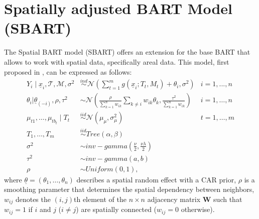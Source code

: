 \documentclass[11pt,a4paper]{article}
\newcommand{\mat}[1]{\mathbf{#1}}
\newcommand{\vect}[1]{\underline{#1}}
\begin{document}
\newpage
\section{Spatially adjusted BART Model (SBART)}
\label{sec:SBARTmodel}
The Spatial BART model (SBART) offers an extension for the base BART that allows to work with spatial data, specifically areal data. This model, first proposed in \cite{Muller_2007}, can be expressed as follows:
\begin{align}
    Y_i \mid \underline{x}_i, \mathcal{T}, \mathcal{M}, \sigma^2 & \stackrel{ind}{\sim} \mathcal{N}\left(\sum_{t=1}^mg\left(\underline{x}_i;  T_t, M_t\right) + \theta_i, \sigma^2\right)        & i = 1,...,n     \\
    \theta_i | \vect{\theta}_{(-i)}, \rho, \tau^2                & \sim \mathcal{N}\left(\frac{\rho}{\sum_{k=1}^nw_{ik}}\sum_{k \neq i} w_{ik}\theta_k, \frac{\tau^2}{\sum_{k=1}^nw_{ik}}\right) & i = 1, \dots, n \\
    \mu_{t1}, \dots, \mu_{tb_t} \mid T_t                         & \stackrel{iid}{\sim} \mathcal{N}(\mu_{\mu}, \sigma^2_{\mu})                                                                   & t = 1,\dots,m   \\
    T_1, \dots, T_m                                              & \stackrel{iid}{\sim} Tree(\alpha, \beta)                                                                                      &                 \\
    \sigma^2                                                     & \sim inv-gamma\left(\frac{\nu}{2}, \frac{\nu\lambda}{2}\right)                                                                &                 \\
    \tau^2                                                       & \sim inv-gamma(a,b)                                                                                                           &                 \\
    \rho                                                         & \sim Uniform(0, 1),                                                                                                           &
\end{align}
where $\vect{\theta} = (\theta_1, \dots, \theta_n)$ describes a spatial random effect with a CAR prior, $\rho$ is a smoothing parameter that determines the spatial dependency between neighbors, $w_{ij}$ denotes the $(i, j)$th element of the $n\times n$ adjacency matrix $\mat{W}$ such that $w_{ij} = 1$ if $i$ and $j$ ($i \neq j$) are spatially connected ($w_{ij} = 0$ otherwise).
\end{document}
